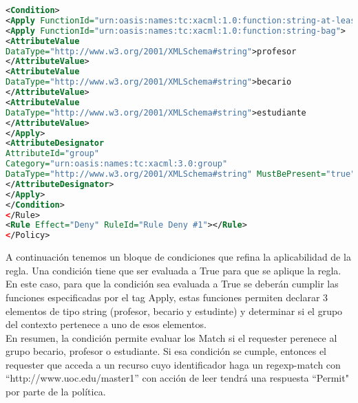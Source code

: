 \documentclass[10pt,a4paper]{article}
\begin{document}
\begin{enumerate}[label=\alph*]
\begin{lstlisting}[language=XML]
<Condition>
<Apply FunctionId="urn:oasis:names:tc:xacml:1.0:function:string-at-least-one-member-of">
<Apply FunctionId="urn:oasis:names:tc:xacml:1.0:function:string-bag">
<AttributeValue
DataType="http://www.w3.org/2001/XMLSchema#string">profesor
</AttributeValue>
<AttributeValue
DataType="http://www.w3.org/2001/XMLSchema#string">becario
</AttributeValue>
<AttributeValue
DataType="http://www.w3.org/2001/XMLSchema#string">estudiante
</AttributeValue>
</Apply>
<AttributeDesignator
AttributeId="group"
Category="urn:oasis:names:tc:xacml:3.0:group"
DataType="http://www.w3.org/2001/XMLSchema#string" MustBePresent="true">
</AttributeDesignator>
</Apply>
</Condition>
</Rule>
<Rule Effect="Deny" RuleId="Rule Deny #1"></Rule>
</Policy>
\end{lstlisting}
A continuación tenemos un bloque de condiciones que refina la aplicabilidad de la regla. Una condición tiene que ser evaluada a True para que se aplique la regla. En este caso, para que la condición sea evaluada a True se deberán cumplir las funciones especificadas por el tag Apply, estas funciones permiten declarar 3 elementos de tipo string (profesor, becario y estudinte) y determinar si el grupo del contexto pertenece a uno de esos elementos. \\

En resumen, la condición permite evaluar los Match si el requester perenece al grupo becario, profesor o estudiante. Si esa condición se cumple, entonces el requester que acceda a un recurso cuyo identificador haga un regexp-match con ``http://www.uoc.edu/master1'' con acción de leer tendrá una respuesta ``Permit" por parte de la política.


\end{enumerate}
\end{document}
